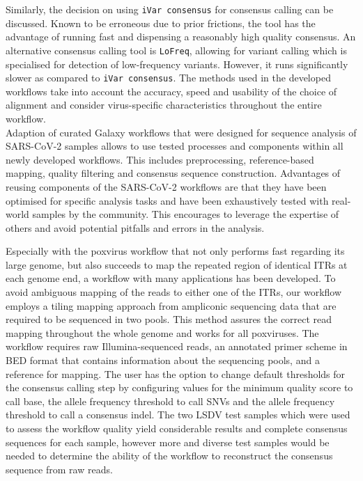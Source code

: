 Similarly, the decision on using \texttt{iVar consensus} for consensus calling can be discussed. Known to be erroneous due to prior frictions, the tool has the advantage of running fast and dispensing a reasonably high quality consensus. An alternative consensus calling tool is \texttt{LoFreq}, allowing for variant calling which is specialised for detection of low-frequency variants. However, it runs significantly slower as compared to \texttt{iVar consensus}. The methods used in the developed workflows take into account the accuracy, speed and usability of the choice of alignment and consider virus-specific characteristics throughout the entire workflow.\\
Adaption of curated Galaxy workflows that were designed for sequence analysis of \ac{SARS-CoV-2} samples allows to use tested processes and components within all newly developed workflows. This includes preprocessing, reference-based mapping, quality filtering and consensus sequence construction. Advantages of reusing components of the \ac{SARS-CoV-2} workflows are that they have been optimised for specific analysis tasks and have been exhaustively tested with real-world samples by the community. This encourages to leverage the expertise of others and avoid potential pitfalls and errors in the analysis.

Especially with the poxvirus workflow that not only performs fast regarding its large genome, but also succeeds to map the repeated region of identical \acp{ITR} at each genome end, a workflow with many applications has been developed. To avoid ambiguous mapping of the reads to either one of the \acp{ITR}, our workflow employs a tiling mapping approach from ampliconic sequencing data that are required to be sequenced in two pools. This method assures the correct read mapping throughout the whole genome and works for all poxviruses. The workflow requires raw Illumina-sequenced reads, an annotated primer scheme in \ac{BED} format that contains information about the sequencing pools, and a reference for mapping. The user has the option to change default thresholds for the consensus calling step by configuring values for the minimum quality score to call base, the allele frequency threshold to call \acp{SNV} and the allele frequency threshold to call a consensus indel. The two \ac{LSDV} test samples which were used to assess the workflow quality yield considerable results and complete consensus sequences for each sample, however more and diverse test samples would be needed to determine the ability of the workflow to reconstruct the consensus sequence from raw reads.

